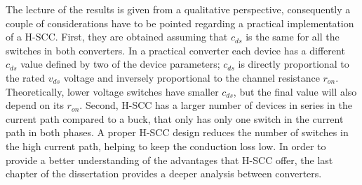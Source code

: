 The lecture of the results is given from a qualitative perspective, consequently a couple of considerations have to be pointed regarding a practical implementation of a H-SCC. First, they are obtained assuming that $c_{ds}$ is the same for all the switches in both converters. In a practical converter each device has a different $c_{ds}$ value defined by two of the device parameters; $c_{ds}$ is directly proportional to the rated $v_{ds}$  voltage and inversely proportional to the channel resistance $r_{on}$. Theoretically, lower voltage switches have smaller $c_{ds}$, but the final value will also depend on its $r_{on}$. Second, H-SCC has a larger number of devices in series in the current path compared to a buck, that only has only one switch in the current path in both phases. A proper H-SCC design reduces the number of switches in the high current path, helping to keep the conduction loss low. In order to provide a better understanding of the advantages that H-SCC offer, the last chapter of the dissertation provides a deeper analysis between converters.

